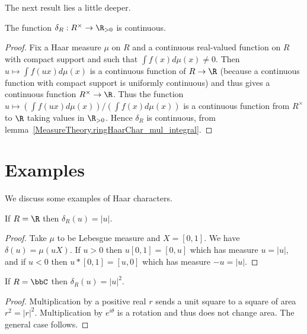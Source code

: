 The next result lies a little deeper.

\begin{corollary}
  \label{MeasureTheory.ringHaarChar_continuous}
  \leanok
  The function $\delta_R:R^\times\to\R_{>0}$ is continuous.
\end{corollary}
\begin{proof}
  Fix a Haar measure $\mu$ on $R$ and a continuous real-valued function
  on $R$ with compact support and such that $\int f(x) d\mu(x)\not=0$.
  Then $u \mapsto \int f(ux) d\mu(x)$ is a continuous function
  of $R\to\R$ (because a continuous function with compact support is uniformly
   continuous) and thus gives a continuous function $R^\times\to\R$.
   Thus the function $u\mapsto (\int f(ux) d\mu(x))/(\int f(x)d\mu(x))$ is
   a continuous function from $R^\times$ to $\R$ taking values in $\R_{>0}$.
   Hence $\delta_R$ is continuous, from lemma~\ref{MeasureTheory.ringHaarChar_mul_integral}.
\end{proof}

\section{Examples}

We discuss some examples of Haar characters.

\begin{lemma}
  \label{distribHaarChar_real}
  If $R=\R$ then $\delta_R(u)=|u|$.
  \leanok
\end{lemma}
\begin{proof}
  \leanok
  Take $\mu$ to be Lebesgue measure and $X=[0,1]$.
We have $\delta(u)=\mu(uX)$. If $u>0$ then $u[0,1]=[0,u]$ which has measure $u=|u|$,
and if $u<0$ then $u*[0,1]=[u,0]$ which has measure $-u=|u|$.
\end{proof}

\begin{lemma}
  \label{distribHaarChar_complex}
  \leanok
  If $R=\bbC$ then $\delta_R(u)=|u|^2$.
\end{lemma}
\begin{proof}
  \leanok
  Multiplication by a positive real $r$ sends a unit square to a square of area $r^2=|r|^2$.
  Multiplication by $e^{i\theta}$ is a rotation and thus does not change area.
  The general case follows.
\end{proof}

